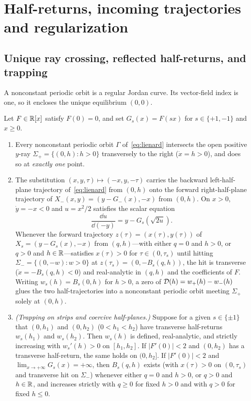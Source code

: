 \section{Half-returns, incoming trajectories and regularization}\label{sec:foundations}

\subsection{Unique ray crossing, reflected half-returns, and trapping}\label{subsec:half-returns}
A nonconstant periodic orbit is a regular Jordan curve. Its vector-field index is one, so it encloses the unique equilibrium $(0,0)$.

\begin{lemma}\label{lem:half-returns}
Let $F\in\mathbb{R}[x]$ satisfy $F(0)=0$, and set $G_s(x)=F(sx)$ for $s\in\{+1,-1\}$ and $x\ge 0$.
\begin{enumerate}
  \item[\textup{(i)}] Every nonconstant periodic orbit $\Gamma$ of~\eqref{eq:lienard} intersects the open positive $y$-ray $\Sigma_+=\{(0,h):h>0\}$ transversely to the right ($\dot x=h>0$), and does so at \emph{exactly one} point.
  \item[\textup{(ii)}] The substitution $(x,y,\tau)\mapsto(-x,y,-\tau)$ carries the backward left-half-plane trajectory of~\eqref{eq:lienard} from $(0,h)$ onto the forward right-half-plane trajectory of $X_-(x,y)=(y-G_-(x),-x)$ from $(0,h)$. On $x>0$, $\dot y=-x<0$ and $u=x^2/2$ satisfies the scalar equation
  \begin{equation}\label{eq:scalar-u}
    \frac{\dd u}{\dd(-y)} = y - G_s(\sqrt{2u}).
  \end{equation}
  Whenever the forward trajectory $z(\tau)=(x(\tau),y(\tau))$ of $X_s=(y-G_s(x),-x)$ from $(q,h)$—with either $q=0$ and $h>0$, or $q>0$ and $h\in\mathbb{R}$—satisfies $x(\tau)>0$ for $\tau\in(0,\tau_s)$ until hitting $\Sigma_-=\{(0,-w):w>0\}$ at $z(\tau_s)=(0,-B_s(q,h))$, the hit is transverse ($\dot x=-B_s(q,h)<0$) and real-analytic in $(q,h)$ and the coefficients of $F$. Writing $w_s(h)=B_s(0,h)$ for $h>0$, a zero of $\mathcal{D}(h)=w_+(h)-w_-(h)$ glues the two half-trajectories into a nonconstant periodic orbit meeting $\Sigma_+$ solely at $(0,h)$.
  \item[\textup{(iii)}] \emph{(Trapping on strips and coercive half-planes.)} Suppose for a given $s\in\{\pm 1\}$ that $(0,h_1)$ and $(0,h_2)$ ($0<h_1<h_2$) have transverse half-returns $w_s(h_1)$ and $w_s(h_2)$. Then $w_s(h)$ is defined, real-analytic, and strictly increasing with $w_s'(h)>0$ on $[h_1,h_2]$. If $|F'(0)|<2$ and $(0,h_2)$ has a transverse half-return, the same holds on $(0,h_2]$. If $|F'(0)|<2$ and $\lim_{x\to+\infty}G_s(x)=+\infty$, then $B_s(q,h)$ exists (with $x(\tau)>0$ on $(0,\tau_s)$ and transverse hit on $\Sigma_-$) whenever either $q=0$ and $h>0$, or $q>0$ and $h\in\mathbb{R}$, and increases strictly with $q\ge 0$ for fixed $h>0$ and with $q>0$ for fixed $h\le 0$.
\end{enumerate}
\end{lemma}

